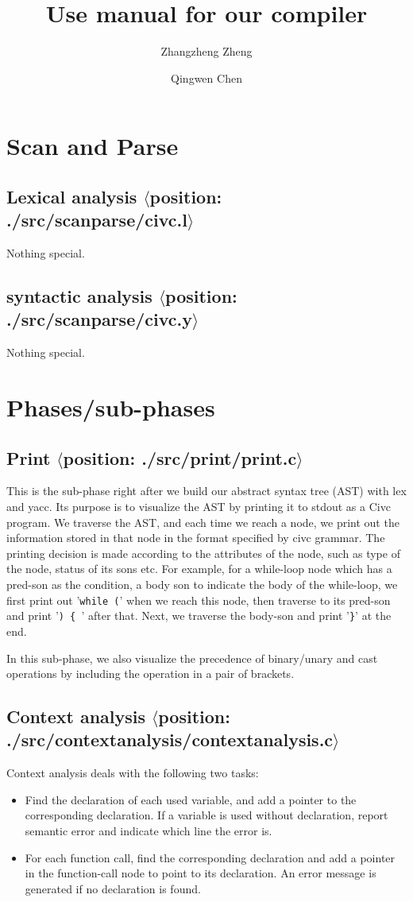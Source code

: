 \documentclass[a4paper,11pt]{article}
\title{Use manual for our compiler}
\author{Zhangzheng Zheng \and Qingwen Chen}
\begin{document}
\maketitle

\section{Scan and Parse}
\subsection*{Lexical analysis $\langle$position: ./src/scanparse/civc.l$\rangle$}
Nothing special.
\subsection*{syntactic analysis $\langle$position: ./src/scanparse/civc.y$\rangle$}
Nothing special.

\section{Phases/sub-phases}
\subsection{Print $\langle$position: ./src/print/print.c$\rangle$ }
This is the sub-phase right after we build our abstract syntax tree (AST) with lex and yacc. Its purpose is to visualize the AST by printing it to stdout as a Civc program. We traverse the AST, and each time we reach a node, we print out the information stored in that node in the format specified by civc grammar.  The printing decision is made according to the attributes of the node, such as type of the node, status of its sons etc. For example, for a while-loop node which has a pred-son as the condition, a body son to indicate the body of the while-loop, we first print out '\texttt{while (}' when we reach this node, then traverse to its pred-son and print '\texttt{) \{ }' after that. Next, we traverse the body-son and print '\texttt{\}}' at the end.

In this sub-phase, we also visualize the precedence of binary/unary and cast operations by including the operation in a pair of brackets.

\subsection{Context analysis $\langle$position: ./src/contextanalysis/contextanalysis.c$\rangle$}
Context analysis deals with the following two tasks:
\begin{itemize}
\item Find the declaration of each used variable, and add a pointer to the corresponding declaration. If a variable is used without declaration, report semantic error and indicate which line the error is.
 \item For each function call, find the corresponding declaration and add a pointer in the function-call node to point to its declaration. An error message    is generated if no declaration is found.
\end{itemize}
\end{document}
